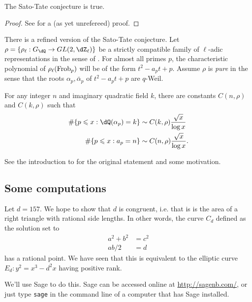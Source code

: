 \begin{theorem}
The Sato-Tate conjecture is true. 
\end{theorem}
\begin{proof}
See \cite[8.3]{bght09} for a (as yet unrefereed) proof. 
\end{proof}

There is a refined version of the Sato-Tate conjecture. Let 
$\rho=\{\rho_\ell:G_\dQ \to GL(2,\dZ_\ell)\}$ be a strictly compatible family 
of $\ell$-adic representations in the sense of \cite[ch.1]{se68}. For almost 
all primes $p$, the characteristic polynomial of $\rho_\ell(\mathrm{Frob}_p)$ will be 
of the form $t^2 - a_p t + p$. Assume $\rho$ is \emph{pure} in the sense that 
the roots $\alpha_p,\bar\alpha_p$ of $t^2-a_p t+p$ are $q$-Weil. 

\begin{conjecture}
For any integer $n$ and imaginary quadratic field $k$, there are constants 
$C(n,\rho)$ and $C(k,\rho)$ such that 
\begin{align*}
  \#\{ p\leqslant x : \dQ(\alpha_p) = k\} &\sim C(k,\rho) \frac{\sqrt x}{\log x} \\
  \#\{p\leqslant x : a_p = n\} &\sim C(n,\rho) \frac{\sqrt x}{\log x} \text{.}
\end{align*}
\end{conjecture}

See the introduction to \cite{lt76} for the original statement and some 
motivation. 





\subsection{Some computations}

Let $d=157$. We hope to show that $d$ is congruent, i.e. that is is the area 
of a right triangle with rational side lengths. In other words, the curve 
$C_d$ defined as the solution set to 
\begin{align*}
  a^2+b^2 &= c^2 \\
  a b/2 &= d
\end{align*}
has a rational point. We have seen that this is equivalent to the elliptic 
curve $E_d:y^2=x^3-d^2 x$ having positive rank. 

We'll use Sage to do this. Sage can be accessed online at 
\url{http://sagenb.com/}, or just type \texttt{sage} in the command line of a 
computer that has Sage installed. 

